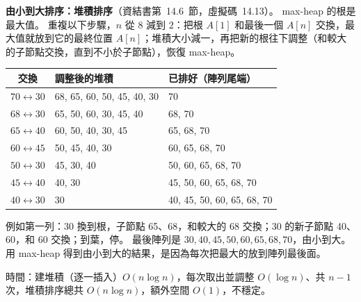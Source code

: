 \begin{pastsoln}
\textbf{由小到大排序：堆積排序}（資結書第~14.6~節，虛擬碼~14.13）。 max-heap 的根是最大值。 重複以下步驟，$n$ 從 $8$ 減到 $2$：把根 $A[1]$ 和最後一個
$A[n]$ 交換，最大值就放到它的最終位置 $A[n]$；堆積大小減一，再把新的根往下調整（和較大的子節點交換，直到不小於子節點），恢復 max-heap。
\begin{center}
\small
\begin{tabular}{cll}
\toprule
交換 & 調整後的堆積 & 已排好（陣列尾端） \\
\midrule
$70 \leftrightarrow 30$ & 68, 65, 60, 50, 45, 40, 30 & 70 \\
$68 \leftrightarrow 30$ & 65, 50, 60, 30, 45, 40 & 68, 70 \\
$65 \leftrightarrow 40$ & 60, 50, 40, 30, 45 & 65, 68, 70 \\
$60 \leftrightarrow 45$ & 50, 45, 40, 30 & 60, 65, 68, 70 \\
$50 \leftrightarrow 30$ & 45, 30, 40 & 50, 60, 65, 68, 70 \\
$45 \leftrightarrow 40$ & 40, 30 & 45, 50, 60, 65, 68, 70 \\
$40 \leftrightarrow 30$ & 30 & 40, 45, 50, 60, 65, 68, 70 \\
\bottomrule
\end{tabular}
\end{center}
例如第一列：30 換到根，子節點 65、68，和較大的 68 交換；30 的新子節點 40、60，和 60 交換；到葉，停。 最後陣列是
$30, 40, 45, 50, 60, 65, 68, 70$，由小到大。 用 max-heap 得到由小到大的結果，是因為每次把最大的放到陣列最後面。

時間：建堆積（逐一插入）$O(n \log n)$，每次取出並調整 $O(\log n)$、共 $n - 1$ 次，堆積排序總共 $O(n \log n)$，額外空間 $O(1)$，不穩定。
\end{pastsoln}
